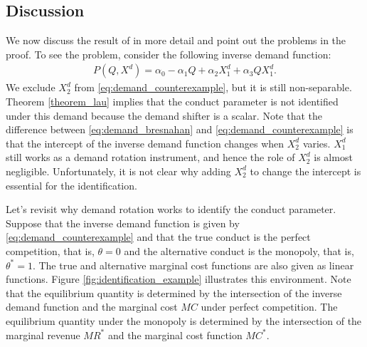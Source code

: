 \documentclass[11pt, a4paper]{article}
\theoremstyle{remark}
\begin{document}
\subsection{Discussion}
We now discuss the result of \citet{lau1982identifying} in more detail and point out the problems in the proof.
To see the problem, consider the following inverse demand function:
\begin{align}
    P(Q, X^{d}) = \alpha_0 - \alpha_1Q + \alpha_2X^{d}_1 + \alpha_3QX^{d}_1. \label{eq:demand_counterexample}
\end{align}
We exclude $X^{d}_2$ from \eqref{eq:demand_counterexample}, but it is still non-separable.
Theorem \ref{theorem_lau} implies that the conduct parameter is not identified under this demand because the demand shifter is a scalar.
Note that the difference between \eqref{eq:demand_bresnahan} and \eqref{eq:demand_counterexample} is that the intercept of the inverse demand function changes when $X^{d}_2$ varies.
$X^{d}_1$ still works as a demand rotation instrument, and hence the role of $X^{d}_2$ is almost negligible. 
Unfortunately, it is not clear why adding $X^{d}_2$ to change the intercept is essential for the identification.


Let's revisit why demand rotation works to identify the conduct parameter.
Suppose that the inverse demand function is given by \eqref{eq:demand_counterexample} and that the true conduct is the perfect competition, that is, $\theta = 0$ and the alternative conduct is the monopoly, that is, $\theta^{*} = 1$.
The true and alternative marginal cost functions are also given as linear functions.
Figure \ref{fig:identification_example} illustrates this environment.
Note that the equilibrium quantity is determined by the intersection of the inverse demand function and the marginal cost $MC$ under perfect competition.
The equilibrium quantity under the monopoly is determined by the intersection of the marginal revenue $MR^{*}$ and the marginal cost function $MC^{*}$.
\end{document}
